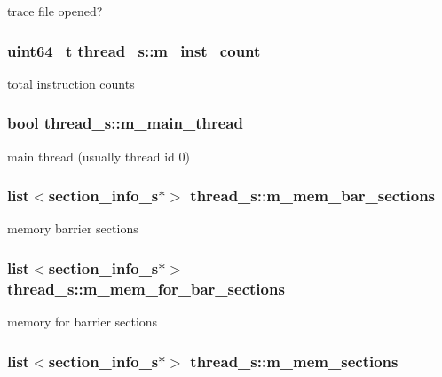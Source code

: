 \label{structthread__s_a0cf104a3dce7ddb37a48cf8b713b4ac2}
trace file opened? \hypertarget{structthread__s_ac29afed70ffd879732e441851c08380f}{
\subsubsection[{m\_\-inst\_\-count}]{\setlength{\rightskip}{0pt plus 5cm}uint64\_\-t {\bf thread\_\-s::m\_\-inst\_\-count}}}
\label{structthread__s_ac29afed70ffd879732e441851c08380f}
total instruction counts \hypertarget{structthread__s_a01a8c95c8e26b8ac986370337d4e15b3}{
\subsubsection[{m\_\-main\_\-thread}]{\setlength{\rightskip}{0pt plus 5cm}bool {\bf thread\_\-s::m\_\-main\_\-thread}}}
\label{structthread__s_a01a8c95c8e26b8ac986370337d4e15b3}
main thread (usually thread id 0) \hypertarget{structthread__s_ac0e1546f48c08ecb93fcebbb2ea53d35}{
\subsubsection[{m\_\-mem\_\-bar\_\-sections}]{\setlength{\rightskip}{0pt plus 5cm}list$<${\bf section\_\-info\_\-s}$\ast$$>$ {\bf thread\_\-s::m\_\-mem\_\-bar\_\-sections}}}
\label{structthread__s_ac0e1546f48c08ecb93fcebbb2ea53d35}
memory barrier sections \hypertarget{structthread__s_a9bf8a0cc4da3251e3fb81372f28b7426}{
\subsubsection[{m\_\-mem\_\-for\_\-bar\_\-sections}]{\setlength{\rightskip}{0pt plus 5cm}list$<${\bf section\_\-info\_\-s}$\ast$$>$ {\bf thread\_\-s::m\_\-mem\_\-for\_\-bar\_\-sections}}}
\label{structthread__s_a9bf8a0cc4da3251e3fb81372f28b7426}
memory for barrier sections \hypertarget{structthread__s_a34206b2835435191b813c943cf4d6c1b}{
\subsubsection[{m\_\-mem\_\-sections}]{\setlength{\rightskip}{0pt plus 5cm}list$<${\bf section\_\-info\_\-s}$\ast$$>$ {\bf thread\_\-s::m\_\-mem\_\-sections}}}
